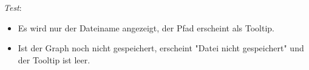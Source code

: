 \emph{Test}:
\begin{itemize}
\item Es wird nur der Dateiname angezeigt, der Pfad erscheint als Tooltip.
\item Ist der Graph noch nicht gespeichert, erscheint "Datei nicht gespeichert" und der Tooltip ist leer.
\end{itemize}
